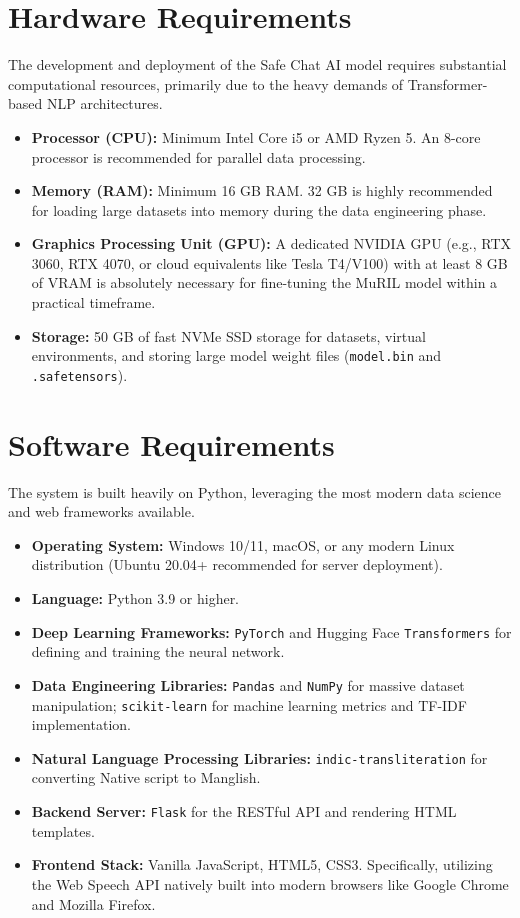 \documentclass[12pt,a4paper]{report}
\begin{document}
\section{Hardware Requirements}
The development and deployment of the Safe Chat AI model requires substantial computational resources, primarily due to the heavy demands of Transformer-based NLP architectures.
\begin{itemize}
    \item \textbf{Processor (CPU):} Minimum Intel Core i5 or AMD Ryzen 5. An 8-core processor is recommended for parallel data processing.
    \item \textbf{Memory (RAM):} Minimum 16 GB RAM. 32 GB is highly recommended for loading large datasets into memory during the data engineering phase.
    \item \textbf{Graphics Processing Unit (GPU):} A dedicated NVIDIA GPU (e.g., RTX 3060, RTX 4070, or cloud equivalents like Tesla T4/V100) with at least 8 GB of VRAM is absolutely necessary for fine-tuning the MuRIL model within a practical timeframe. 
    \item \textbf{Storage:} 50 GB of fast NVMe SSD storage for datasets, virtual environments, and storing large model weight files (\texttt{model.bin} and \texttt{.safetensors}).
\end{itemize}

\section{Software Requirements}
The system is built heavily on Python, leveraging the most modern data science and web frameworks available.
\begin{itemize}
    \item \textbf{Operating System:} Windows 10/11, macOS, or any modern Linux distribution (Ubuntu 20.04+ recommended for server deployment).
    \item \textbf{Language:} Python 3.9 or higher.
    \item \textbf{Deep Learning Frameworks:} \texttt{PyTorch} and Hugging Face \texttt{Transformers} for defining and training the neural network.
    \item \textbf{Data Engineering Libraries:} \texttt{Pandas} and \texttt{NumPy} for massive dataset manipulation; \texttt{scikit-learn} for machine learning metrics and TF-IDF implementation.
    \item \textbf{Natural Language Processing Libraries:} \texttt{indic-transliteration} for converting Native script to Manglish.
    \item \textbf{Backend Server:} \texttt{Flask} for the RESTful API and rendering HTML templates.
    \item \textbf{Frontend Stack:} Vanilla JavaScript, HTML5, CSS3. Specifically, utilizing the Web Speech API natively built into modern browsers like Google Chrome and Mozilla Firefox.
\end{itemize}
\end{document}
